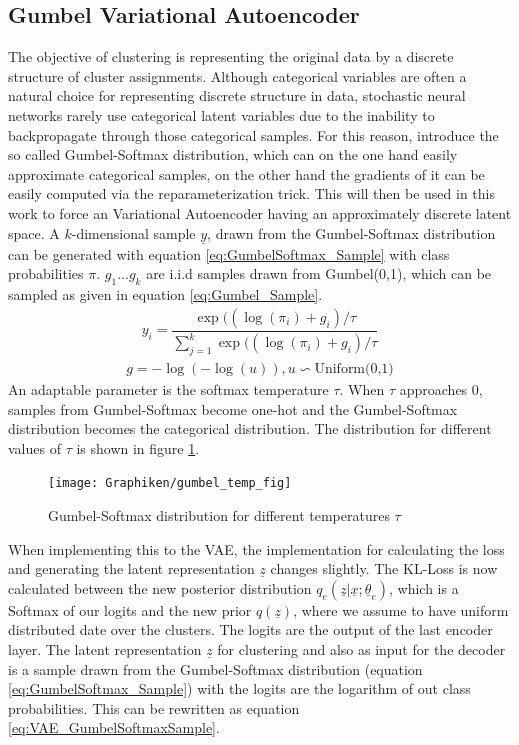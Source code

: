 \documentclass[12pt,DIV14,BCOR12mm,a4paper,footexclude,headinclude,halfparskip-,twoside,openright,cleardoubleempty,idxtotoc,bibtotoc,listtotoc]{scrreprt} %
\numberwithin{equation}{chapter}
\begin{document}
\subsection{Gumbel Variational Autoencoder}
The objective of clustering is representing the original data by a discrete structure of cluster assignments. Although categorical variables are often a natural choice for representing discrete structure in data, stochastic neural networks rarely use categorical latent variables due to the inability to backpropagate through those categorical samples. For this reason, \cite{Jang17GumbelVAE} introduce the so called Gumbel-Softmax distribution, which can on the one hand easily approximate categorical samples, on the other hand the gradients of it can be easily computed via the reparameterization trick. This will then be used in this work to force an Variational Autoencoder having an approximately discrete latent space. A $k$-dimensional sample $\underline{y}$, drawn from the Gumbel-Softmax distribution can be generated with equation \ref{eq:GumbelSoftmax_Sample} with class probabilities $\pi$. $g_1...g_k$ are i.i.d samples drawn from Gumbel(0,1), which can be sampled as given in equation \ref{eq:Gumbel_Sample}.
\begin{align}
	y_i = \dfrac{\exp((\log(\pi_i)+g_i)/\tau}{\sum_{j=1}^{k}\exp((\log(\pi_i)+g_i)/\tau}\label{eq:GumbelSoftmax_Sample}
\end{align}
\begin{align}
	g = -\log(-\log(u)), u \backsim \textrm{Uniform(0,1)}\label{eq:Gumbel_Sample}
\end{align}
An adaptable parameter is the softmax temperature $\tau$. When $\tau$ approaches $0$, samples from Gumbel-Softmax become one-hot and the Gumbel-Softmax distribution becomes the categorical distribution. The distribution for different values of $\tau$ is shown in figure \ref{fig:Gumbel-Softmax_Distr}.
\begin{figure}[htb!]
	\centering
	\texttt{[image: Graphiken/gumbel\_temp\_fig]}
	\caption{Gumbel-Softmax distribution for different temperatures $\tau$ \cite{Jang17GumbelVAE}}
	\label{fig:Gumbel-Softmax_Distr}
\end{figure}
When implementing this to the VAE, the implementation for calculating the loss and generating the latent representation $\underline{z}$ changes slightly. The KL-Loss is now calculated between the new posterior distribution $q_e(\underline{z}|\underline{x};\underline{\theta}_e)$, which is a Softmax of our logits and the new prior $q(\underline{z})$, where we assume to have uniform distributed date over the clusters. The logits are the output of the last encoder layer. The latent representation $\underline{z}$ for clustering and also as input for the decoder is a sample drawn from the Gumbel-Softmax distribution (equation \ref{eq:GumbelSoftmax_Sample}) with the logits are the logarithm of out class probabilities. This can be rewritten as equation \ref{eq:VAE_GumbelSoftmaxSample}.
\end{document}
